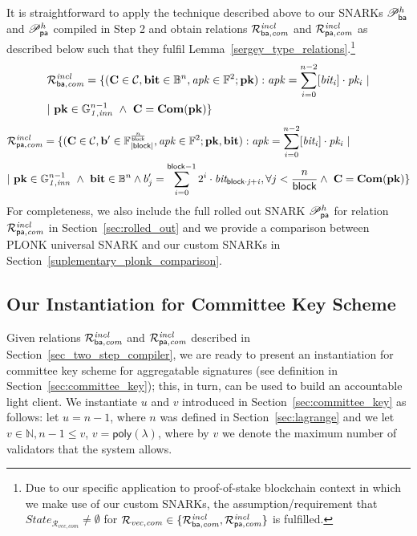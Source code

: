\noindent It is straightforward to apply the technique described above to our SNARKs $\mathscr{P}_{\mathsf{ba}}^{h}$ and $\mathscr{P}_{\mathsf{pa}}^{h}$ 
compiled in Step 2 and obtain relations $\mathcal{R}^{\mathit{incl}}_{\mathsf{ba},\mathit{com}}$ and $\mathcal{R}^{\mathit{incl}}_{\mathsf{pa},\mathit{com}}$ as described below such that they fulfil Lemma~\ref{sergey_type_relations}.\footnote{Due to our specific application to proof-of-stake blockchain context in which we make use of our custom SNARKs, 
the assumption/requirement that  $\mathit{State}_{\mathcal{R}_{\mathit{vec}, \mathit{com}}} \neq \emptyset$ for 
$\mathcal{R}_{\mathit{vec}, \mathit{com}} \in \{\mathcal{R}^{\mathit{incl}}_{\mathsf{ba},\mathit{com}}, \mathcal{R}^{\mathit{incl}}_{\mathsf{pa},\mathit{com}} \}$ is fulfilled.}
\begin{align*}
& {\mathcal{R}^{\mathit{incl}}_{\mathsf{ba},\mathit{com}}} = \{(\mathbf{C} \in \mathcal{C}, \mathbf{bit} \in \mathbb{B}^n, \mathit{apk} \in \mathbb{F}^2; \mathbf{pk}) : 
\mathit{apk} = \sum_{i=0}^{n-2} [\mathit{bit_i}] \cdot \mathit{pk_i} \ | \\ & | \ \mathbf{pk} \in \mathbb{G}_{\mathit{1,inn}}^{n-1} \ \wedge \  \mathbf{C} = \mathbf{Com}(\mathbf{pk}) \} 
\end{align*}
\begin{align*}
& {\mathcal{R}^{\mathit{incl}}_{\mathsf{pa},\mathit{com}}}  = \{(\mathbf{C} \in \mathcal{C}, \mathbf{b'} \in \mathbb{F}_{|\mathsf{block}|}^{\frac{n}{\mathsf{block}}}, \mathit{apk} \in \mathbb{F}^2;\mathbf{pk}, \mathbf{bit}) : 
\mathit{apk} = \sum_{i=0}^{n-2} [\mathit{bit_i}] \cdot \mathit{pk_i} \ | \\ & | \ \mathbf{pk} \in \mathbb{G}_{\mathit{1,inn}}^{n-1} \ \wedge \ \mathbf{bit} \in \mathbb{B}^n  \wedge b'_{j} = \sum_{i=0}^{\mathsf{block} -1}2^i \cdot \mathit{bit_{\mathsf{block} \cdot j + i}}, \forall j < \frac{n}{\mathsf{block}}  \wedge \  \mathbf{C} = \mathbf{Com}(\mathbf{pk}) \} 
\end{align*}
For completeness, we also include the full rolled out SNARK $\mathscr{P}_{\mathsf{pa}}^{h}$ for relation $\mathcal{R}^{\mathit{incl}}_{\mathsf{pa},\mathit{com}}$ in Section~\ref{sec:rolled_out} and we provide a comparison between PLONK universal 
SNARK and our custom SNARKs in Section~\ref{suplementary_plonk_comparison}.  
\subsection{Our Instantiation for Committee Key Scheme}
\label{sec:inst_committee_key}
\noindent Given relations $\mathcal{R}^{\mathit{incl}}_{\mathsf{ba},\mathit{com}}$ and $\mathcal{R}^{\mathit{incl}}_{\mathsf{pa},\mathit{com}}$ described in Section~\ref{sec_two_step_compiler}, 
we are ready to present an instantiation for committee key scheme for aggregatable signatures 
(see definition in Section~\ref{sec:committee_key}); this, in turn, can be used to build an accountable light client. 
We instantiate $u$ and $v$ introduced in Section~\ref{sec:committee_key} as follows: let $u = n-1$, where $n$ was defined in 
Section~\ref{sec:lagrange} and we let $v \in \mathbb{N}, n-1 \leq v$, $v = \mathsf{poly}(\lambda)$, where by $v$ we denote the 
maximum number of validators that the system allows.

